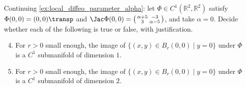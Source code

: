\begin{exercise}
\label{ex:image_of_segment_submanifold}
Continuing \cref{ex:local_diffeo_parameter_alpha}: let $\Phi \in C^1(\mathbb{R}^2,\mathbb{R}^2)$
satisfy $\Phi(0,0) = (0,0)\transp$ and
$\Jac\Phi(0,0) = \left(\begin{smallmatrix} \alpha+5 & -3 \\ 3 & \alpha-5\end{smallmatrix}\right)$,
and take $\alpha = 0$. Decide whether each of the following is true or false, with justification.
\begin{enumerate}[label=\textbf{(\alph*)}]
  \setcounter{enumi}{3}
  \item For $r > 0$ small enough, the image of $\{(x,y) \in B_r(0,0) \mid y = 0\}$ under $\Phi$ is
    a $C^1$ submanifold of dimension $1$.
  \item For $r > 0$ small enough, the image of $\{(x,y) \in B_r(0,0) \mid y = 0\}$ under $\Phi$ is
    a $C^1$ submanifold of dimension $2$.
\end{enumerate}
\end{exercise}


